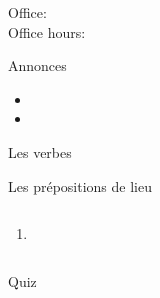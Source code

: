 \documentclass{beamer}
\subtitle[Prépositions et verbes \lexi{-re}]{Les prépositions de lieu et les verbes \lexi{-re}}
\begin{document}
  \begin{frame}
    \titlepage
    \tiny{Office: \\
          Office hours: }
  \end{frame}

  \begin{frame}{Annonces}
    \begin{itemize}
      \item
      \item[] \tinygloss{}
    \end{itemize}
  \end{frame}

  \begin{frame}{Les verbes }
    \begin{center}
      
    \end{center}
  \end{frame}

  \begin{frame}{Les prépositions de lieu}
    \begin{columns}
        \begin{enumerate}
          \item
        \end{enumerate}
        \begin{minipage}[c][0.6\textheight]{\linewidth}
          \begin{center}
          \end{center}
        \end{minipage}
    \end{columns}
  \end{frame}

  \begin{frame}{}
    \begin{center}
      \Large Quiz
    \end{center}
  \end{frame}
\end{document}
